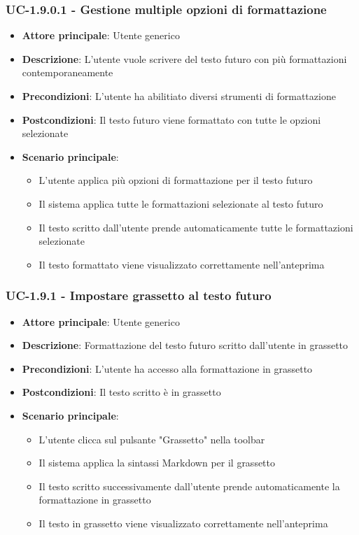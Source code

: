 \documentclass[11pt,a4paper]{article}
\begin{document}
\subsubsection{UC-1.9.0.1 - Gestione multiple opzioni di formattazione}
\begin{itemize}
    \item \textbf{Attore principale}: Utente generico
    \item \textbf{Descrizione}: L'utente vuole scrivere del testo futuro con più formattazioni contemporaneamente
    \item \textbf{Precondizioni}: L’utente ha abilitiato diversi strumenti di formattazione
    \item \textbf{Postcondizioni}: Il testo futuro viene formattato con tutte le opzioni selezionate
    \item \textbf{Scenario principale}:
        \begin{itemize}
            \item L'utente applica più opzioni di formattazione per il testo futuro
            \item Il sistema applica tutte le formattazioni selezionate al testo futuro
            \item Il testo scritto dall'utente prende automaticamente tutte le formattazioni selezionate
            \item Il testo formattato viene visualizzato correttamente nell'anteprima
        \end{itemize}
\end{itemize}

\subsubsection{UC-1.9.1 - Impostare grassetto al testo futuro}
\begin{itemize}
    \item \textbf{Attore principale}: Utente generico
    \item \textbf{Descrizione}: Formattazione del testo futuro scritto dall’utente in grassetto
    \item \textbf{Precondizioni}: L’utente ha accesso alla formattazione in grassetto
    \item \textbf{Postcondizioni}: Il testo scritto è in grassetto
    \item \textbf{Scenario principale}:
        \begin{itemize}
            \item L’utente clicca sul pulsante "Grassetto" nella toolbar
            \item Il sistema applica la sintassi Markdown per il grassetto
            \item Il testo scritto successivamente dall'utente prende automaticamente la formattazione in grassetto
            \item Il testo in grassetto viene visualizzato correttamente nell'anteprima
        \end{itemize}
\end{itemize}
\end{document}

